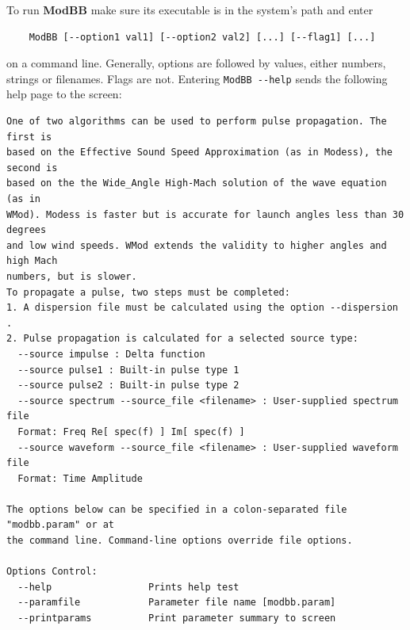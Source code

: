 To run {\bf ModBB} make sure its executable is in the system's path and enter 
\begin{verbatim} 
    ModBB [--option1 val1] [--option2 val2] [...] [--flag1] [...] 
\end{verbatim}
on a command line. Generally, options are followed by values, either numbers, strings or filenames. Flags are not. Entering \verb"ModBB --help" sends the following help page to the screen: 
\begin{verbatim}
One of two algorithms can be used to perform pulse propagation. The first is
based on the Effective Sound Speed Approximation (as in Modess), the second is
based on the the Wide_Angle High-Mach solution of the wave equation (as in
WMod). Modess is faster but is accurate for launch angles less than 30 degrees
and low wind speeds. WMod extends the validity to higher angles and high Mach
numbers, but is slower.
To propagate a pulse, two steps must be completed:
1. A dispersion file must be calculated using the option --dispersion .
2. Pulse propagation is calculated for a selected source type:
  --source impulse : Delta function
  --source pulse1 : Built-in pulse type 1
  --source pulse2 : Built-in pulse type 2
  --source spectrum --source_file <filename> : User-supplied spectrum file
  Format: Freq Re[ spec(f) ] Im[ spec(f) ]
  --source waveform --source_file <filename> : User-supplied waveform file
  Format: Time Amplitude

The options below can be specified in a colon-separated file "modbb.param" or at
the command line. Command-line options override file options.

Options Control:
  --help                 Prints help test
  --paramfile            Parameter file name [modbb.param]
  --printparams          Print parameter summary to screen


\end{verbatim}
